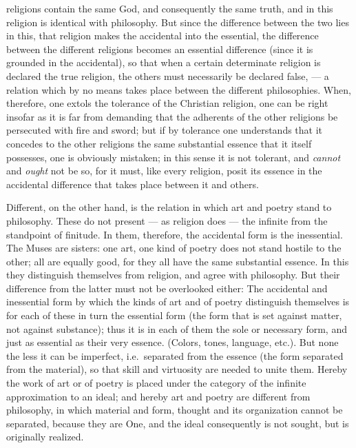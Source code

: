 \documentclass[12pt,a4paper,openany]{book}
\newcommand{\opage}[1]{\marginnote{\footnotesize\textit{[#1]}}}
\begin{document}
religions contain the same God, and consequently the same truth, and in this religion
is identical with philosophy. But since the difference between the two lies in this,
that religion makes the accidental into the essential, the difference between the
different religions becomes an essential difference (since it is grounded in the
accidental), so that when a certain determinate religion is declared the true
religion, the others must necessarily be declared false, --- a relation which by no
means takes place between the different philosophies. When, therefore, one extols the
tolerance of the Christian religion, one can be right insofar as it is far from
demanding that the adherents of the other religions be persecuted with fire and
sword; but if by tolerance one understands that it concedes to the other religions
the same substantial essence that it itself possesses, one is obviously mistaken; in
this sense it is not tolerant, and \emph{cannot} and \emph{ought} not be so, for it
must, like every religion, posit its essence in the accidental difference that takes
place between it and others.

Different, on the other hand, is the relation in which art and poetry stand to
philosophy. These do not present --- as religion does --- the infinite from the
standpoint of finitude. In them, therefore, the accidental form is the inessential.
The Muses are sisters: one art, one kind of poetry does not stand hostile to the
other; all are equally good, for they all have the same substantial essence. In this
they distinguish themselves from religion, and agree with philosophy. But
\setcounter{footnote}{0}%
\opage{153}their difference from the latter must not be overlooked either: The accidental and
inessential form by which the kinds of art and of poetry distinguish themselves is
for each of these in turn the essential form (the form that is set against matter,
not against substance); thus it is in each of them the sole or necessary form, and
just as essential as their very essence. (Colors, tones, language, etc.). But none
the less it can be imperfect, i.e.\ separated from the essence (the form separated
from the material), so that skill and virtuosity are needed to unite them. Hereby the
work of art or of poetry is placed under the category of the infinite approximation
to an ideal; and hereby art and poetry are different from philosophy, in which
material and form, thought and its organization cannot be separated, because they are
One, and the ideal consequently is not sought, but is originally realized.
\end{document}
